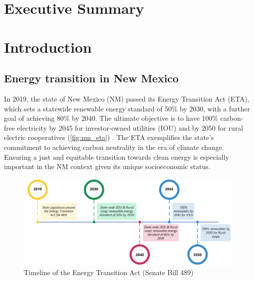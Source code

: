\documentclass[12pt,twoside,letterpaper]{article}
\begin{document}
\onehalfspacing


\section*{Executive Summary}

\newpage

\tableofcontents

\newpage
\section{Introduction}

\subsection{Energy transition in New Mexico}


In 2019, the state of New Mexico (NM) passed its Energy Transition Act (ETA), which sets a statewide renewable energy standard of 50\% by 2030, with a further goal of achieving 80\% by 2040. The ultimate objective is to have 100\% carbon-free electricity by 2045 for investor-owned utilities (IOU) and by 2050 for rural electric cooperatives (\autoref{fig:nm_eta}) \parencite{nmleg2019}. The ETA exemplifies the state's commitment to achieving carbon neutrality in the era of climate change. Ensuring a just and equitable transition towards clean energy is especially important in the NM context given its unique socioeconomic status.

\begin{figure}[!ht]
    \centering
    \includegraphics[width=1\textwidth]{figures/nm_eta.png}
    \caption{Timeline of the Energy Transition Act (Senate Bill 489)}
    \label{fig:nm_eta}
\end{figure}
\end{document}

